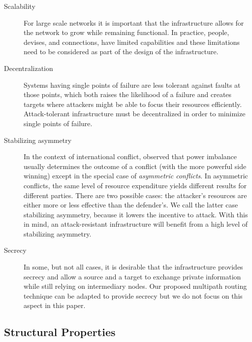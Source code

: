 \documentclass[prodmode,permissions]{acmsmall-ec16}
\begin{document}
\begin{description}
\item[Scalability]
For large scale networks it is important that the infrastructure allows for the network to grow while remaining functional. In practice, people, devises, and connections, have limited capabilities and these limitations need to be considered as part of the design of the infrastructure. 

\item [Decentralization]
Systems having single points of failure are less tolerant against faults at those
points, which both raises the likelihood of a failure and creates targets
where attackers might be able to focus their resources efficiently.
Attack-tolerant infrastructure must be decentralized in order to minimize single points of failure.

\item[Stabilizing asymmetry]
In the context of international conflict,
\cite{mack_why_1975}
observed that power imbalance usually determines the outcome of a conflict
(with the more powerful side winning)
except in the special case of {\em asymmetric conflicts}.
In asymmetric conflicts, the same level of resource expenditure yields different
results for different parties.
There are two possible cases:
the attacker's resources are either more or less effective than the defender's.
We call the latter case stabilizing asymmetry,
because it lowers the incentive to attack.
With this in mind, an attack-resistant infrastructure will benefit from a high
level of stabilizing asymmetry.

\item[Secrecy]
In some, but not all cases, it is desirable that the infrastructure provides secrecy and allow a source and a target to exchange private information while still relying on intermediary nodes. Our proposed multipath routing technique can be adapted to provide secrecy but we do not focus on this aspect in this paper. 

\end{description}
\subsection{Structural Properties}
\end{document}
